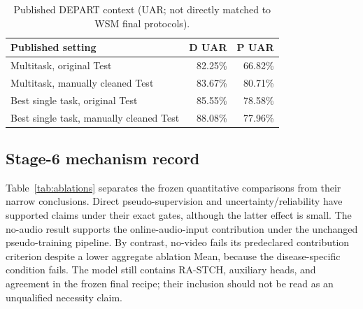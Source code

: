 \begin{table}[t]
\centering\scriptsize
\caption{Published DEPART context (UAR; not directly matched to WSM final protocols).}
\label{tab:depart}
\begin{tabular}{lrr}
\toprule
Published setting & D UAR & P UAR\\
\midrule
Multitask, original Test & 82.25\% & 66.82\%\\
Multitask, manually cleaned Test & 83.67\% & 80.71\%\\
Best single task, original Test & 85.55\% & 78.58\%\\
Best single task, manually cleaned Test & 88.08\% & 77.96\%\\
\bottomrule
\end{tabular}
\end{table}

\subsection{Stage-6 mechanism record}

Table~\ref{tab:ablations} separates the frozen quantitative comparisons from their narrow conclusions. Direct pseudo-supervision and uncertainty/reliability have supported claims under their exact gates, although the latter effect is small. The no-audio result supports the online-audio-input contribution under the unchanged pseudo-training pipeline. By contrast, no-video fails its predeclared contribution criterion despite a lower aggregate ablation Mean, because the disease-specific condition fails. The model still contains RA-STCH, auxiliary heads, and agreement in the frozen final recipe; their inclusion should not be read as an unqualified necessity claim.

